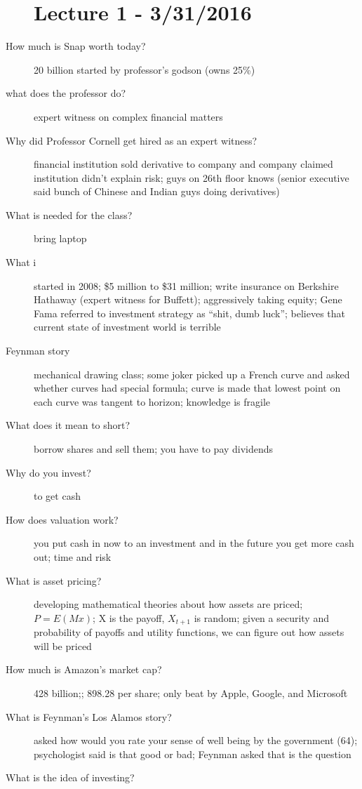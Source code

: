 \documentclass[11pt]{article}
\begin{document}
\begin{description}
\section{Lecture 1 - 3/31/2016}
\item[How much is Snap worth today?]
  20 billion
  started by professor's godson (owns 25\%)
\item[what does the professor do?]
  expert witness on complex financial matters
\item[Why did Professor Cornell get hired as an expert witness?]
  financial institution sold derivative to company and company claimed institution didn't explain risk;
  guys on 26th floor knows (senior executive said bunch of Chinese and Indian guys doing derivatives)
\item[What is needed for the class?]
  bring laptop
\item[What i]
  started in 2008;
  \$5 million to \$31 million;
  write insurance on Berkshire Hathaway (expert witness for Buffett);
  aggressively taking equity;
  Gene Fama referred to investment strategy as ``shit, dumb luck'';
  believes that current state of investment world is terrible
\item[Feynman story]
  mechanical drawing class;
  some joker picked up a French curve and asked whether curves had special formula;
  curve is made that lowest point on each curve was tangent to horizon;
  knowledge is fragile
\item[What does it mean to short?]
  borrow shares and sell them;
  you have to pay dividends
\item[Why do you invest?]
  to get cash
\item[How does valuation work?]
  you put cash in now to an investment and in the future you get more cash out;
  time and risk
\item[What is asset pricing?]
  developing mathematical theories about how assets are priced;
  $P = E(Mx)$;
  X is  the payoff, $X_{t+1}$ is random;
  given a security and probability of payoffs and utility functions, we can figure out how assets will be priced
\item[How much is Amazon's market cap?]
  428 billion;; 898.28 per share;
  only beat by Apple, Google, and Microsoft
\item[What is Feynman's Los Alamos story?]
  asked how would you rate your sense of well being by the government (64);
  psychologist said is that good or bad;
  Feynman asked that is the question
\item[What is the idea of investing?]

\end{description}
\end{document}
